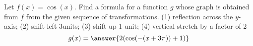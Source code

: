 \documentclass{ximera}
\author{Kenneth Berglund}
\begin{document}
\begin{exercise}
Let $f(x) = \cos(x)$. Find a formula for a function $g$ whose graph is obtained from $f$ from the given
sequence of transformations.
(1) reflection across the $y$-axis; (2) shift left 3\pi units; (3) shift up 1 unit; (4) vertical stretch by a factor of 2
\[
g(x)=\answer{2(\cos(-(x + 3\pi)) + 1)}
\]
\end{exercise}
\end{document}

